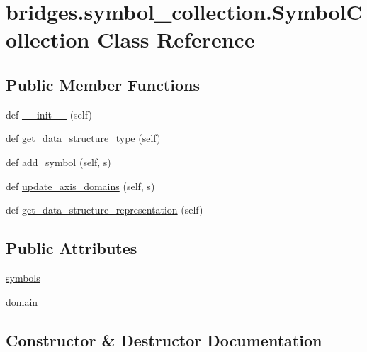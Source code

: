 \hypertarget{classbridges_1_1symbol__collection_1_1_symbol_collection}{}\section{bridges.\+symbol\+\_\+collection.\+Symbol\+Collection Class Reference}
\label{classbridges_1_1symbol__collection_1_1_symbol_collection}
\subsection*{Public Member Functions}
\begin{DoxyCompactItemize}
\item 
def \mbox{\hyperlink{classbridges_1_1symbol__collection_1_1_symbol_collection_a7ba838d831a2dce6d74fe920c7de52fd}{\+\_\+\+\_\+init\+\_\+\+\_\+}} (self)
\item 
def \mbox{\hyperlink{classbridges_1_1symbol__collection_1_1_symbol_collection_a84a2d68da2df79389b6bec06ee99f72d}{get\+\_\+data\+\_\+structure\+\_\+type}} (self)
\item 
def \mbox{\hyperlink{classbridges_1_1symbol__collection_1_1_symbol_collection_a11e36a56b1d7dbf23175d4b1ab3cd378}{add\+\_\+symbol}} (self, s)
\item 
def \mbox{\hyperlink{classbridges_1_1symbol__collection_1_1_symbol_collection_af0906b48ee3ee868bb7779561d3f710c}{update\+\_\+axis\+\_\+domains}} (self, s)
\item 
def \mbox{\hyperlink{classbridges_1_1symbol__collection_1_1_symbol_collection_a09fb16fe5f14457654e5f2680131ccc9}{get\+\_\+data\+\_\+structure\+\_\+representation}} (self)
\end{DoxyCompactItemize}
\subsection*{Public Attributes}
\begin{DoxyCompactItemize}
\item 
\mbox{\hyperlink{classbridges_1_1symbol__collection_1_1_symbol_collection_ae94322e7b56bc84ab844031ba58b2ea8}{symbols}}
\item 
\mbox{\hyperlink{classbridges_1_1symbol__collection_1_1_symbol_collection_af66fe5a0221042cfb0fba8a57eaa6395}{domain}}
\end{DoxyCompactItemize}


\subsection{Constructor \& Destructor Documentation}
\mbox{\label{classbridges_1_1symbol__collection_1_1_symbol_collection_a7ba838d831a2dce6d74fe920c7de52fd}} 
